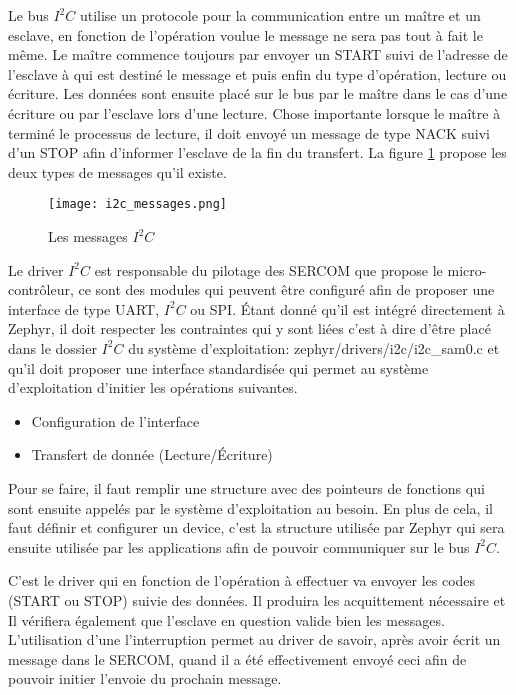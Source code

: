Le bus $I^{2}C$ utilise un protocole pour la communication entre un maître et un esclave, en fonction de l'opération voulue le message ne sera pas tout à fait le même. Le maître commence toujours par envoyer un START suivi de l'adresse de l'esclave à qui est destiné le message et puis enfin du type d'opération, lecture ou écriture. Les données sont ensuite placé sur le bus par le maître dans le cas d'une écriture ou par l'esclave lors d'une lecture. Chose importante lorsque le maître à terminé le processus de lecture, il doit envoyé un message de type NACK suivi d'un STOP afin d'informer l'esclave de la fin du transfert.
La figure \ref{fig:i2c_messages} propose les deux types de messages qu'il existe.

\begin{figure}[htb]
\centering 
\texttt{[image: i2c\_messages.png]} 
\caption{Les messages $I^{2}C$}
\label{fig:i2c_messages}
\end{figure}

Le driver $I^{2}C$ est responsable du pilotage des SERCOM que propose le micro-contrôleur, ce sont des modules qui peuvent être configuré afin de proposer une interface de type UART, $I^{2}C$ ou SPI. Étant donné qu'il est intégré directement à Zephyr, il doit respecter les contraintes qui y sont liées c'est à dire d'être placé dans le dossier $I^{2}C$ du système d'exploitation: zephyr/drivers/i2c/i2c\_sam0.c et qu'il doit proposer une interface standardisée qui permet au système d'exploitation d'initier les opérations suivantes.

\begin{itemize}
\item Configuration de l'interface
\item Transfert de donnée (Lecture/Écriture)
\end{itemize}

Pour se faire, il faut remplir une structure avec des pointeurs de fonctions qui sont ensuite appelés par le système d'exploitation au besoin. En plus de cela, il faut définir et configurer un device, c'est la structure utilisée par Zephyr qui sera ensuite utilisée par les applications afin de pouvoir communiquer sur le bus $I^{2}C$.

C'est le driver qui en fonction de l'opération à effectuer va envoyer les codes (START ou STOP) suivie des données. Il produira les acquittement nécessaire et Il vérifiera également que l'esclave en question valide bien les messages. L'utilisation d'une l'interruption permet au driver de savoir, après avoir écrit un message dans le SERCOM, quand il a été effectivement envoyé ceci afin de pouvoir initier l'envoie du prochain message.

